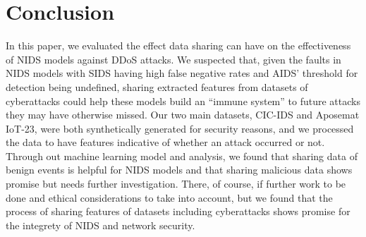 \section{Conclusion}
\label{sec:conclusion}

In this paper, we evaluated the effect data sharing can have on the effectiveness of NIDS models against DDoS attacks. We suspected that, given the faults in NIDS models with SIDS having high false negative rates and AIDS’ threshold for detection being undefined, sharing extracted features from datasets of cyberattacks could help these models build an “immune system” to future attacks they may have otherwise missed. Our two main datasets, CIC-IDS and Aposemat IoT-23, were both synthetically generated for security reasons, and we processed the data to have features indicative of whether an attack occurred or not. Through out machine learning model and analysis, we found that sharing data of benign events is helpful for NIDS models and that sharing malicious data shows promise but needs further investigation. There, of course, if further work to be done and ethical considerations to take into account, but we found that the process of sharing features of datasets including cyberattacks shows promise for the integrety of NIDS and network security. 
